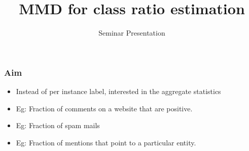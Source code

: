 \documentclass{beamer}
\title{MMD for class ratio estimation}
\institute[IITB]{
  Indian Institute of Technology Bombay, Mumbai
}
\author{Seminar Presentation}
\begin{document}
\maketitle
\begin{frame}
 \frametitle{Aim}
 \begin{itemize}
  \item Instead of per instance label, interested in the aggregate statistics\medskip
  \item Eg: Fraction of comments on a website that are positive.\medskip
  \item Eg: Fraction of spam mails\medskip
  \item Eg: Fraction of mentions that point to a particular entity.\medskip
 \end{itemize}
\end{frame}
\end{document}
